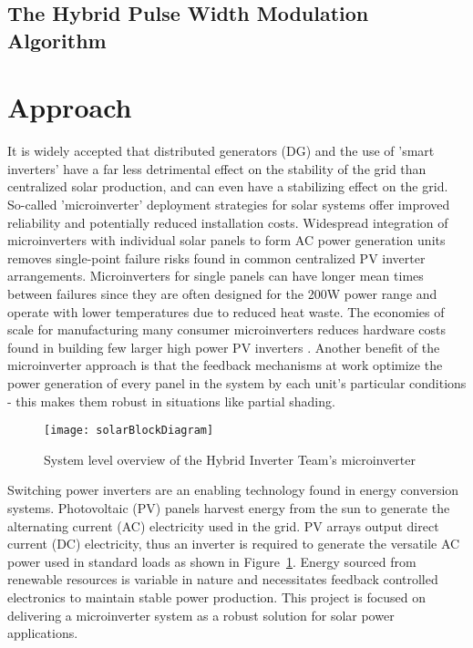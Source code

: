 \subsection{The Hybrid Pulse Width Modulation Algorithm}


\section{Approach}
It is widely accepted that distributed generators (DG) and the use of 'smart inverters' have a far less detrimental effect on the stability of the grid than centralized solar production, and can even have a stabilizing effect on the grid. So-called 'microinverter' deployment strategies for solar systems offer improved reliability and potentially reduced installation costs. Widespread integration of microinverters with individual solar panels to form AC power generation units removes single-point failure risks found in common centralized PV inverter arrangements. Microinverters for single panels can have longer mean times between failures since they are often designed for the 200W power range and operate with lower temperatures due to reduced heat waste. The economies of scale for manufacturing many consumer microinverters reduces hardware costs found in building few larger high power PV inverters \cite{microchip}. Another benefit of the microinverter approach is that the feedback mechanisms at work optimize the power generation of every panel in the system by each unit's particular conditions - this makes them robust in situations like partial shading.

\begin{figure}[h]
\centering
\texttt{[image: solarBlockDiagram]}
\caption{System level overview of the Hybrid Inverter Team's microinverter}
\label{solarBlock}
\end{figure}
Switching power inverters are an enabling technology found in energy conversion systems. Photovoltaic (PV) panels harvest energy from the sun to generate the alternating current (AC) electricity used in the grid. PV arrays output direct current (DC) electricity, thus an inverter is required to generate the versatile AC power used in standard loads as shown in Figure~\ref{solarBlock}. Energy sourced from renewable resources is variable in nature and necessitates feedback controlled electronics to maintain stable power production. This project is focused on delivering a microinverter system as a robust solution for solar power applications. 

